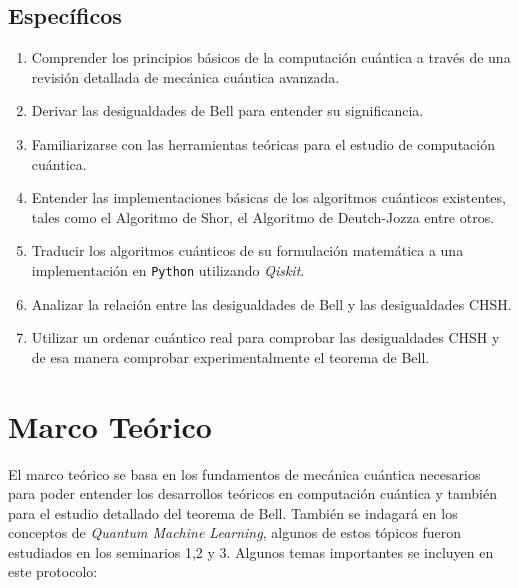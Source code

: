 \documentclass[a4paper]{article}
\begin{document}
\subsection{Específicos}
\begin{enumerate}
\item Comprender los principios básicos de la computación cuántica a través de una revisión detallada de mecánica cuántica avanzada.
\item Derivar las desigualdades de Bell para entender su significancia.
\item Familiarizarse con las herramientas teóricas para el estudio de computación cuántica.
\item Entender las implementaciones básicas de los algoritmos cuánticos existentes, tales como el Algoritmo de Shor, el Algoritmo de Deutch-Jozza entre otros.
\item Traducir los algoritmos cuánticos de su formulación matemática a una implementación en \texttt{Python} utilizando \textit{Qiskit}.
\item Analizar la relación entre las desigualdades de Bell y las desigualdades CHSH.
\item Utilizar un ordenar cuántico real para comprobar las desigualdades CHSH y de esa manera comprobar experimentalmente el teorema de Bell.

\end{enumerate}
\section{Marco Teórico}
El marco teórico se basa en los fundamentos de mecánica cuántica necesarios para poder entender los desarrollos teóricos en computación cuántica y también para el estudio detallado del teorema de Bell\cite{Bell}. También se indagará en los conceptos de \textit{Quantum Machine Learning}, algunos de estos tópicos fueron estudiados en los seminarios 1,2 y 3. Algunos temas importantes se incluyen en este protocolo:
\end{document}
